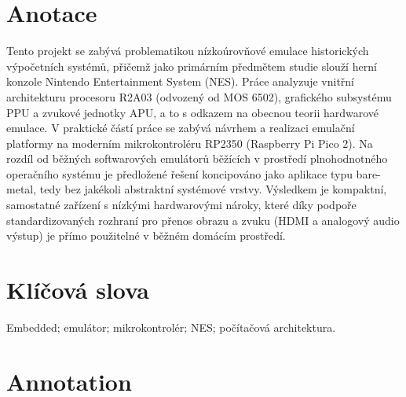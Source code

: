 \documentclass{soc}
\author{Alexey Kachaev, Jakub Jansa}
\begin{document}
\maketitle
{}

\pagestyle{empty}

\section*{Anotace}

Tento projekt se zabývá problematikou nízkoúrovňové emulace historických výpočetních systémů,
přičemž jako primárním předmětem studie slouží herní konzole Nintendo Entertainment System (NES).
Práce analyzuje vnitřní architekturu procesoru R2A03 (odvozený od MOS 6502), grafického subsystému
PPU a zvukové jednotky APU, a to s odkazem na obecnou teorii hardwarové emulace. V praktické částí
práce se zabývá návrhem a realizaci emulační platformy na moderním mikrokontroléru RP2350 (Raspberry
Pi Pico 2). Na rozdíl od běžných softwarových emulátorů běžících v prostředí plnohodnotného
operačního systému je předložené řešení koncipováno jako aplikace typu bare-metal, tedy bez jakékoli
abstraktní systémové vrstvy. Výsledkem je kompaktní, samostatné zařízení s nízkými hardwarovými
nároky, které díky podpoře standardizovaných rozhraní pro přenos obrazu a zvuku (HDMI a analogový
audio výstup) je přímo použitelné v běžném domácím prostředí.

\section*{Klíčová slova}

Embedded; emulátor; mikrokontrolér; NES; počítačová architektura.

\section*{Annotation}
\end{document}
